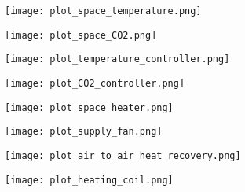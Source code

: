 \begin{figure*}
    \centering
    \begin{subfigure}{0.45\linewidth}
        \centering
        \texttt{[image: plot\_space\_temperature.png]}
        \vspace*{\distanceToCaption mm}
        \caption{}
        \label{fig:space_temperature}
    \end{subfigure}
    \begin{subfigure}{0.45\linewidth}
        \centering
        \texttt{[image: plot\_space\_CO2.png]}
        \vspace*{\distanceToCaption mm}
        \caption{}
        \label{fig:space_CO2}
    \end{subfigure}
    
     
    \begin{subfigure}{0.45\linewidth}
        \centering
        \texttt{[image: plot\_temperature\_controller.png]}
        \vspace*{\distanceToCaption mm}
        \caption{}
        \label{fig:temperature_controller}
    \end{subfigure}
    \begin{subfigure}{0.45\linewidth}
        \centering
        \texttt{[image: plot\_CO2\_controller.png]}
        \vspace*{\distanceToCaption mm}
        \caption{}
        \label{fig:CO2_controller}
    \end{subfigure}


    \begin{subfigure}{0.45\linewidth}
        \centering
        \texttt{[image: plot\_space\_heater.png]}
        \vspace*{\distanceToCaption mm}
        \caption{}
        \label{fig:space_heater}
    \end{subfigure}
    \begin{subfigure}{0.45\linewidth}
        \centering
        \texttt{[image: plot\_supply\_fan.png]}
        \vspace*{\distanceToCaption mm}
        \caption{}
        \label{fig:supply_fan}
    \end{subfigure}
    
    \begin{subfigure}{0.45\linewidth}
        \centering
        \texttt{[image: plot\_air\_to\_air\_heat\_recovery.png]}
        \vspace*{\distanceToCaption mm}
        \caption{}
        \label{fig:air_to_air_heat_recovery}
    \end{subfigure}
    \begin{subfigure}{0.45\linewidth}
        \centering
        \texttt{[image: plot\_heating\_coil.png]}
        \vspace*{\distanceToCaption mm}
        \caption{}
        \label{fig:heating_coil}
    \end{subfigure}
     

\end{figure*}
